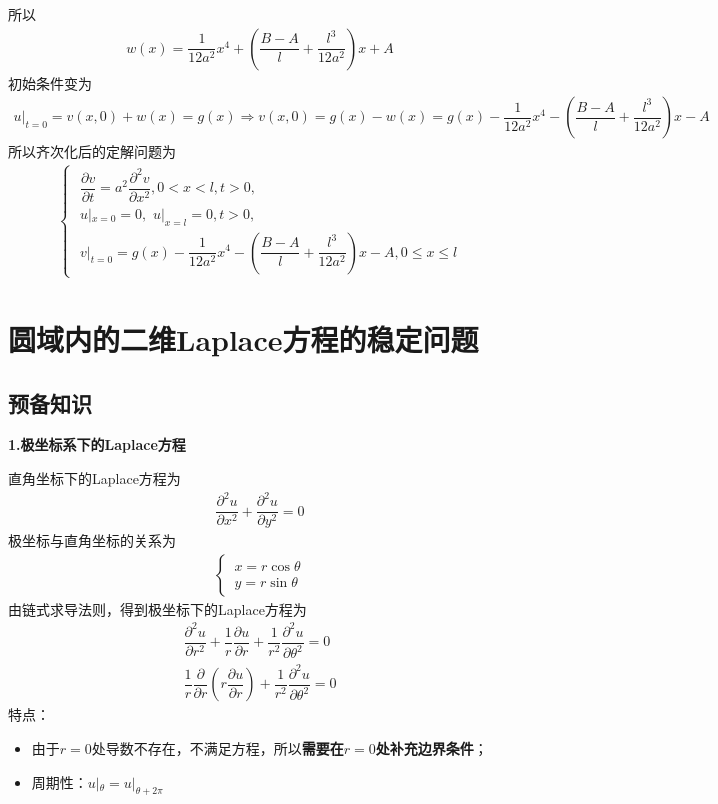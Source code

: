 所以
\begin{align}
	w(x) = \dfrac{1}{12a^2}x^4 + \left(\dfrac{B-A}{l}+\dfrac{l^3}{12a^2} \right)x + A
\end{align}
初始条件变为
\begin{align*}
	u|_{t = 0} = v(x, 0) + w(x) = g(x) \Rightarrow v(x,0) = g(x) - w(x) = g(x) -  \dfrac{1}{12a^2}x^4 - \left(\dfrac{B-A}{l}+\dfrac{l^3}{12a^2} \right)x - A
\end{align*}
所以齐次化后的定解问题为
\begin{align}
	\begin{cases}
		\,\, \dfrac{\partial v}{\partial t} = a^2 \dfrac{\partial^2 v}{\partial x^2}, 0<x<l, t>0,\\
		\,\, u|_{x = 0} = 0, \,\, u|_{x=l} = 0, t>0, \\
		\,\, v|_{t = 0} = g(x) -  \dfrac{1}{12a^2}x^4 - \left(\dfrac{B-A}{l}+\dfrac{l^3}{12a^2} \right)x - A, 0 \le x \le l
	\end{cases}
\end{align}


\section{圆域内的二维Laplace方程的稳定问题}
\subsection{预备知识}
\noindent \textbf{1.极坐标系下的Laplace方程}

直角坐标下的Laplace方程为
\begin{align}
	\dfrac{\partial^2 u}{\partial x^2} + \dfrac{\partial^2 u}{\partial y^2} = 0
\end{align}
极坐标与直角坐标的关系为
\begin{align}
	\begin{cases}
		\, x = r\cos \theta \\
		\, y = r \sin \theta 
	\end{cases}
\end{align}
由链式求导法则，得到极坐标下的Laplace方程为
\begin{align}
	\dfrac{\partial^2 u}{\partial r^2} + \dfrac{1}{r}\dfrac{\partial u}{\partial r} + \dfrac{1}{r^2}\dfrac{\partial^2 u}{\partial \theta^2} = 0\\[1em]
	\dfrac{1}{r}\dfrac{\partial}{\partial r}\left(r \dfrac{\partial u}{\partial r}\right)+\dfrac{1}{r^2}\dfrac{\partial^2 u}{\partial \theta^2} =0
\end{align}
特点：
\begin{itemize}
	\item 由于$r = 0$处导数不存在，不满足方程，所以\textbf{需要在$r=0$处补充边界条件}；
	\item 周期性：$u|_{\theta} = u|_{\theta + 2 \pi}$
\end{itemize}


